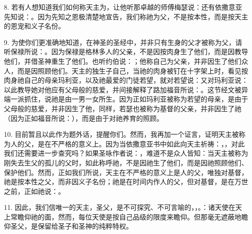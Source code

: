 8. 若有人想知道我们如何称天主为，让他听那卓越的师傅梅瑟说：还有依撒意亚先知说：。因为先知之恩极清楚地宣告，我们称祂为父，不是按本性，而是按天主的恩宠和义子名份。\par

9. 为使你们更准确地知道，在神圣的圣经中，并非只有生身的父才被称为父，请听保禄所说：。因为保禄是格林多人的父亲，不是因按肉身生了他们，而是因教导他们，并借圣神重生了他们。也听约伯说：；他称自己为父亲，并非因生了他们众人，而是因照顾他们。天主的独生子自己，当祂的肉身被钉在十字架上时，看见按肉身祂自己的母亲玛利亚，以及祂最爱的门徒若望，就对若望说：又对玛利亚说：以此教导她对他应有父母般的慈爱，并间接解释了路加福音所说：。这节经文被异端一派抓住，说祂是由一男一女所生。因为正如玛利亚被称为若望的母亲，是由于父母般的慈爱，并非因生了他，同样，若瑟也被称为基督的父亲，并非因生了祂（因为正如福音所说：），而是由于对祂养育的照顾。\par

10. 目前暂且以此作为题外话，提醒你们。然而，我再加一个证言，证明天主被称为人的父，是在不严格的意义上。因为当依撒意亚书中如此向天主祈祷：，，对此我们还需要进一步查究吗？如果圣咏作者说：，难道不是众人皆知：当天主被称为刚失去生父的孤儿的父时，如此称呼祂，不是因祂生了他们，而是因祂照顾他们、保护他们。然而，正如我们所说，天主在不严格的意义上是人的父，唯独对基督，祂是按本性之父，而非因义子名份；祂是在时间内作人的父，但对基督，是在万世之前，正如祂说：。\par

11. 因此，我们信唯一的天主，圣父，是不可探究、不可言喻的，，。：诸天使在天上常瞻仰祂的面，然而，每位天使是按自己品级的限度来瞻仰。但那毫无遮蔽地瞻仰圣父，是保留给圣子和圣神的纯粹特权。\par

